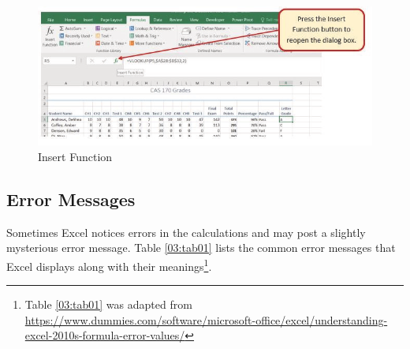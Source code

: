 \begin{figure}[H]
	\centering
	\includegraphics[width=\maxwidth{.95\linewidth}]{gfx/ch03_fig15}
	\caption{Insert Function}
	\label{03:fig15}
\end{figure}

\subsection{Error Messages}

Sometimes Excel notices errors in the calculations and may post a slightly mysterious error message. Table \ref{03:tab01} lists the common error messages that Excel displays along with their meanings\footnote{Table \ref{03:tab01} was adapted from  \url{https://www.dummies.com/software/microsoft-office/excel/understanding-excel-2010s-formula-error-values/}}.

